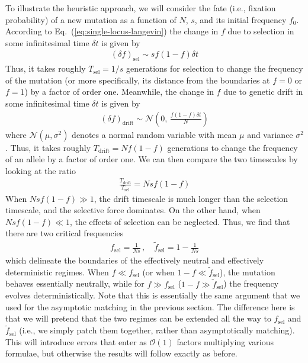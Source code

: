 \documentclass[11pt]{article}
\newcommand{\eq}[1]{Eq.~(\ref{#1})}
\begin{document}
To illustrate the heuristic approach, we will consider the fate (i.e., fixation probability) of a new mutation as a function of $N$, $s$, and its initial frequency $f_0$. According to \eq{eq:single-locus-langevin} the change in $f$ due to selection in some infinitesimal time $\delta t$ is given by
\begin{align}
( \delta f )_\mathrm{sel} \sim s  f (1-f) \delta t 
\end{align} 
Thus, it takes roughly $T_\mathrm{sel} = 1/s$ generations for selection to change the frequency of the mutation (or more specifically, its distance from the boundaries at $f=0$ or $f=1$) by a factor of order one. Meanwhile, the change in $f$ due to genetic drift in some infinitesimal time $\delta t$ is given by
\begin{align}
( \delta f)_\mathrm{drift} \sim \mathcal{N}\left(0, \, \frac{f(1-f) \delta t}{N} \right) 
\end{align} 
where $\mathcal{N}(\mu,\sigma^2)$ denotes a normal random variable with mean $\mu$ and variance $\sigma^2$. Thus, it takes roughly $T_\mathrm{drift} = N f(1-f)$ generations to change the frequency of an allele by a factor of order one. We can then compare the two timescales by looking at the ratio 
\begin{align}
\frac{T_\mathrm{drift}}{T_\mathrm{sel}} = N s f(1-f)
\end{align}
When $Ns f (1-f) \gg 1$, the drift timescale is much longer than the selection timescale, and the selective force dominates. On the other hand, when $Ns f(1-f) \ll 1$, the effects of selection can be neglected. Thus, we find that there are two critical frequencies
\begin{align}
f_\mathrm{sel} = \frac{1}{Ns} \, , \quad \tilde{f}_\mathrm{sel} = 1 - \frac{1}{Ns}  
\end{align}
which delineate the boundaries of the effectively neutral and effectively deterministic regimes. When $f \ll f_\mathrm{sel}$ (or when $1-f \ll \tilde{f}_\mathrm{sel}$), the mutation behaves essentially neutrally, while for $f \gg f_\mathrm{sel}$ ($1-f \gg \tilde{f}_\mathrm{sel}$) the frequency evolves deterministically. Note that this is essentially the same argument that we used for the asymptotic matching in the previous section. The difference here is that we will pretend that the two regimes can be extended all the way to $f_\mathrm{sel}$ and $\tilde{f}_\mathrm{sel}$ (i.e., we simply patch them together, rather than asymptotically matching). This will introduce errors that enter as $\mathcal{O}(1)$ factors multiplying various formulae, but otherwise the results will follow exactly as before. 
\end{document}
